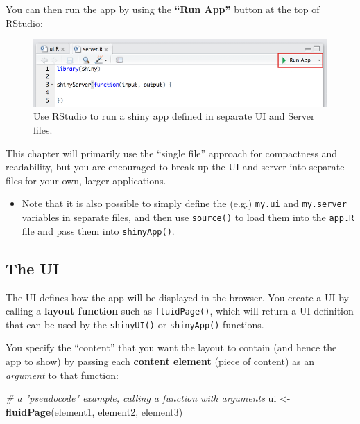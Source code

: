 \documentclass[]{book}
\newenvironment{Shaded}{\begin{snugshade}}{\end{snugshade}}
\newcommand{\KeywordTok}[1]{\textcolor[rgb]{0.13,0.29,0.53}{\textbf{#1}}}
\newcommand{\StringTok}[1]{\textcolor[rgb]{0.31,0.60,0.02}{#1}}
\newcommand{\CommentTok}[1]{\textcolor[rgb]{0.56,0.35,0.01}{\textit{#1}}}
\newcommand{\NormalTok}[1]{#1}
\providecommand{\tightlist}{%
  \setlength{\itemsep}{0pt}\setlength{\parskip}{0pt}}
\theoremstyle{definition}
\theoremstyle{definition}
\theoremstyle{remark}
\begin{document}
You can then run the app by using the \textbf{``Run App''} button at the
top of RStudio:

\begin{figure}
\centering
\includegraphics{img/shiny/run-app.png}
\caption{Use RStudio to run a shiny app defined in separate UI and
Server files.}
\end{figure}

This chapter will primarily use the ``single file'' approach for
compactness and readability, but you are encouraged to break up the UI
and server into separate files for your own, larger applications.

\begin{itemize}
\tightlist
\item
  Note that it is also possible to simply define the (e.g.)
  \texttt{my.ui} and \texttt{my.server} variables in separate files, and
  then use \texttt{source()} to load them into the \texttt{app.R} file
  and pass them into \texttt{shinyApp()}.
\end{itemize}

\subsection{The UI}\label{the-ui}

The UI defines how the app will be displayed in the browser. You create
a UI by calling a \textbf{layout function} such as \texttt{fluidPage()},
which will return a UI definition that can be used by the
\texttt{shinyUI()} or \texttt{shinyApp()} functions.

You specify the ``content'' that you want the layout to contain (and
hence the app to show) by passing each \textbf{content element} (piece
of content) as an \emph{argument} to that function:

\begin{Shaded}
\begin{Highlighting}[]
\CommentTok{# a "pseudocode" example, calling a function with arguments}
\NormalTok{ui <-}\StringTok{ }\KeywordTok{fluidPage}\NormalTok{(element1, element2, element3)}
\end{Highlighting}
\end{Shaded}
\end{document}
